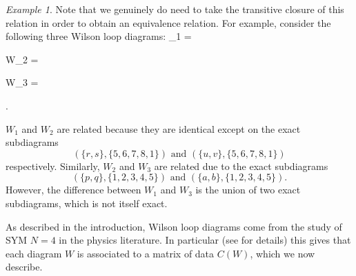 \documentclass[11pt]{article}
\newcommand{\drawWLD}[2]{

\pgfmathsetmacro{\n}{#1}
\pgfmathsetmacro{\radius}{#2}
\pgfmathsetmacro{\angle}{360/\n}
\draw (0,0) circle (\radius);
    \foreach \i in {1,2,...,\n} {
      \draw (\angle*\i:\radius) node {$\bullet$};
    }

}
\newcommand{\drawlabeledprop}[5]{
\pgfmathsetmacro{\r}{#1}
\pgfmathsetmacro{\bumpr}{#2}
\pgfmathsetmacro{\s}{#3}
\pgfmathsetmacro{\bumps}{#4}
\pgfmathsetmacro{\perturbe}{\angle/\n}

\begin{scope}
\draw[propagator] (\angle*\r + \angle/2 + \bumpr*\perturbe:\radius) -- (\angle*\s + \angle/2 + \bumps*\perturbe:\radius) node[midway, below] {#5};
\end{scope}
}
\newcommand{\drawnumbers}{
  \foreach \i in {1,2,...,\n} {
  \pgfmathsetmacro{\x}{\angle*\i}
  \draw (\x:\radius*1.15) node {\footnotesize \i};
}
}
\def\bas #1\eas{\begin{align*} #1 \end{align*}}
\theoremstyle{remark}
\newtheorem{eg}[thm]{Example}
\theoremstyle{definition}
\begin{document}
\begin{eg} \label{eg:equivdiags}
Note that we genuinely do need to take the transitive closure of this relation in order to obtain an equivalence relation. For example, consider the following three Wilson loop diagrams: 
\bas
W_1 =  \quad
W_2 =  \quad
W_3 =  .
\eas


$W_1$ and $W_2$ are related because they are identical except on the exact subdiagrams 
\[(\{r, s\}, \{5,6,7,8,1\}) \text{ and }(\{u, v\}, \{5,6,7,8,1\})\] respectively. Similarly, $W_2$ and $W_3$ are related due to the exact subdiagrams 
\[(\{p, q\}, \{1,2,3,4,5\}) \text{ and }(\{a, b\}, \{1,2,3,4,5\}).\] 
However, the difference between $W_1$ and $W_3$ is the union of two exact subdiagrams, which is not itself exact.

\end{eg}
\medskip

As described in the introduction, Wilson loop diagrams come from the study of SYM $N = 4$ in the physics literature. In particular (see \cite[section 2]{HeslopStewart} for details) this gives that each diagram $W$ is associated to a matrix of data $C(W)$, which we now describe. 
\end{document}
